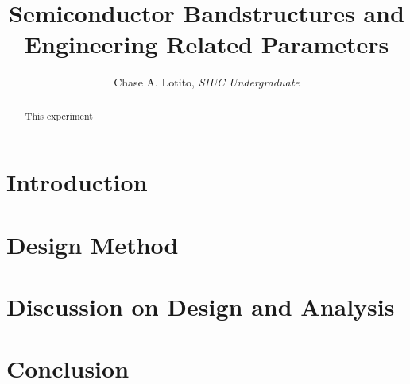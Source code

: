 \documentclass{IEEEtran}
\title{Semiconductor Bandstructures and Engineering Related Parameters}
\author{Chase A. Lotito, \textit{SIUC Undergraduate}}
\date{}
\begin{document}
\maketitle %

\begin{abstract}
    This experiment
\end{abstract}

\section{Introduction}

\section{Design Method}

\section{Discussion on Design and Analysis}

\section{Conclusion}
\end{document}
